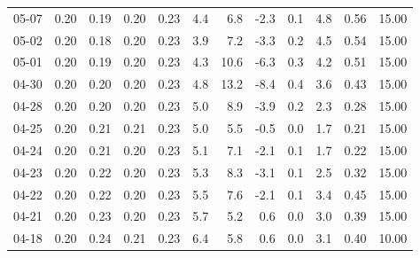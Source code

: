 \begin{threeparttable}
{\begin{tabular}{lrrrrrrrrrrr}
  05-07 &          0.20 &          0.19 &          0.20 &        0.23 &                 4.4 &                 6.8 &       -2.3 &                 0.1 &              4.8 &            0.56 &                  15.00 \\
  05-02 &          0.20 &          0.18 &          0.20 &        0.23 &                 3.9 &                 7.2 &       -3.3 &                 0.2 &              4.5 &            0.54 &                  15.00 \\
  05-01 &          0.20 &          0.19 &          0.20 &        0.23 &                 4.3 &                10.6 &       -6.3 &                 0.3 &              4.2 &            0.51 &                  15.00 \\
  04-30 &          0.20 &          0.20 &          0.20 &        0.23 &                 4.8 &                13.2 &       -8.4 &                 0.4 &              3.6 &            0.43 &                  15.00 \\
  04-28 &          0.20 &          0.20 &          0.20 &        0.23 &                 5.0 &                 8.9 &       -3.9 &                 0.2 &              2.3 &            0.28 &                  15.00 \\
  04-25 &          0.20 &          0.21 &          0.21 &        0.23 &                 5.0 &                 5.5 &       -0.5 &                 0.0 &              1.7 &            0.21 &                  15.00 \\
  04-24 &          0.20 &          0.21 &          0.20 &        0.23 &                 5.1 &                 7.1 &       -2.1 &                 0.1 &              1.7 &            0.22 &                  15.00 \\
  04-23 &          0.20 &          0.22 &          0.20 &        0.23 &                 5.3 &                 8.3 &       -3.1 &                 0.1 &              2.5 &            0.32 &                  15.00 \\
  04-22 &          0.20 &          0.22 &          0.20 &        0.23 &                 5.5 &                 7.6 &       -2.1 &                 0.1 &              3.4 &            0.45 &                  15.00 \\
  04-21 &          0.20 &          0.23 &          0.20 &        0.23 &                 5.7 &                 5.2 &        0.6 &                 0.0 &              3.0 &            0.39 &                  15.00 \\
  04-18 &          0.20 &          0.24 &          0.21 &        0.23 &                 6.4 &                 5.8 &        0.6 &                 0.0 &              3.1 &            0.40 &                  10.00 \\

\end{tabular}}
\end{threeparttable}
